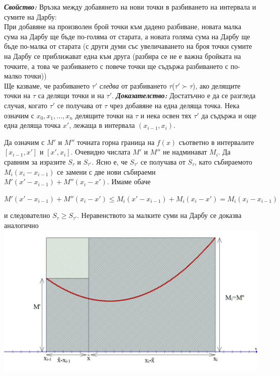 \documentclass[11pt]{article} %
\newcommand{\italicBold}[1]{\textbf{\emph{#1}}}
\newcommand{\proof}{\italicBold{Доказателство: }}
\begin{document}
\italicBold{Свойство: } Връзка между добавянето на нови точки в разбиването на интервала и сумите на Дарбу:\\
При добавяне на произволен брой точки към дадено разбиване, новата малка сума на Дарбу ще бъде по-голяма от старата, а новата голяма сума на Дарбу ще бъде по-малка от старата (с други думи със увеличаването на броя точки сумите на Дарбу се приближават една към друга (разбира се не е важна бройката на точките, а това че разбиването с повече точки ще съдържа разбиването с по-малко точки))\\
Ще казваме, че разбиването $\tau'$ \textit{следва} от разбиването $\tau$($\tau' \succ \tau$), ако делящите точки на $\tau$ са делящи точки и на $\tau'$.
\proof Достатъчно е да се разгледа случая, когато $\tau'$ се получава от $\tau$ чрез добавяне на една деляща точка. Нека означим с $x_{0}, x_{1},...,x_{n}$ делящите точки на $\tau$ и нека освен тях $\tau'$ да съдържа и още една деляща точка $x'$, лежаща в интервала $(x_{i-1},x_{i})$.\par

Да означим с $M'$ и $M''$ точната горна граница на $f(x)$ съответно в интервалите $[x_{i-1}, x']$ и $[x', x_{i}]$. Очевидно числата $M'$ и $M''$ не надминават $M_{i}$. Да сравним за изразите $S_{\tau}$ и $S_{\tau'}$. Ясно е, че $S_{\tau'}$ се получава от $S_{\tau}$, като събираемото $M_{i}(x_{i}-x_{i-1})$ се замени с две нови събираеми $M'(x'-x_{i-1})+M''(x_{i}-x')$. Имаме обаче\\
\centerline{$M'(x'-x_{i-1})+M''(x_{i}-x')\leq M_{i}(x'-x_{i-1})+M_{i}(x_{i}-x')=M_{i}(x_{i}-x_{i-1})$}
и следователно $S_{\tau} \geq S_{\tau'}$. Неравенството за малките суми на Дарбу се доказва аналогично\\
\includegraphics[scale=0.35]{Darbu.jpg}\\\par 
\end{document}
